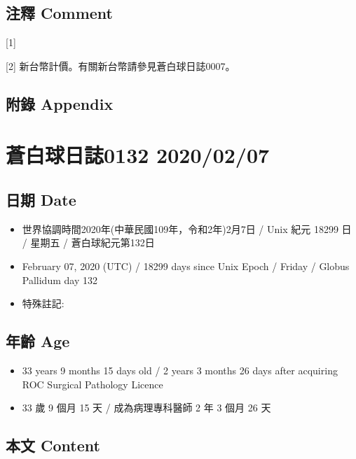 \documentclass[
]{article}
\providecommand{\tightlist}{%
  \setlength{\itemsep}{0pt}\setlength{\parskip}{0pt}}
\begin{document}
\hypertarget{ux6ce8ux91cb-comment-66}{%
\subsection{注釋 Comment}\label{ux6ce8ux91cb-comment-66}}

{[}1{]}

{[}2{]} 新台幣計價。有關新台幣請參見蒼白球日誌0007。

\hypertarget{ux9644ux9304-appendix-67}{%
\subsection{附錄 Appendix}\label{ux9644ux9304-appendix-67}}

\hypertarget{ux84bcux767dux7403ux65e5ux8a8c0132-20200207}{%
\section{蒼白球日誌0132
2020/02/07}\label{ux84bcux767dux7403ux65e5ux8a8c0132-20200207}}

\hypertarget{ux65e5ux671f-date-68}{%
\subsection{日期 Date}\label{ux65e5ux671f-date-68}}

\begin{itemize}
\tightlist
\item
  世界協調時間2020年(中華民國109年，令和2年)2月7日 / Unix 紀元 18299 日
  / 星期五 / 蒼白球紀元第132日
\item
  February 07, 2020 (UTC) / 18299 days since Unix Epoch / Friday /
  Globus Pallidum day 132
\item
  特殊註記:
\end{itemize}

\hypertarget{ux5e74ux9f61-age-68}{%
\subsection{年齡 Age}\label{ux5e74ux9f61-age-68}}

\begin{itemize}
\tightlist
\item
  33 years 9 months 15 days old / 2 years 3 months 26 days after
  acquiring ROC Surgical Pathology Licence
\item
  33 歲 9 個月 15 天 / 成為病理專科醫師 2 年 3 個月 26 天
\end{itemize}

\hypertarget{ux672cux6587-content-68}{%
\subsection{本文 Content}\label{ux672cux6587-content-68}}
\end{document}
